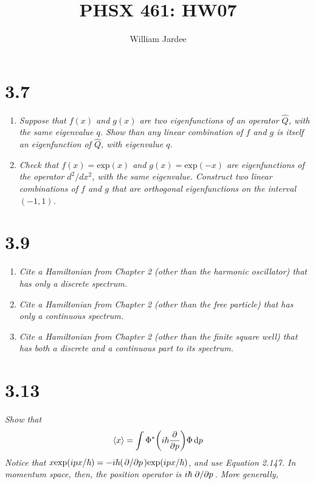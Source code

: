 \documentclass[12pt]{article}
\begin{document}
\title{PHSX 461: HW07}
\author{William Jardee}
\maketitle

\section*{3.7}
\begin{enumerate}[label=\alph*)]
\item \emph{Suppose that $f(x)$ and $g(x)$ are two eigenfunctions of an operator $\hat{Q}$, with the same eigenvalue $q$. Show than any linear combination of $f$ and $g$ is itself an eigenfunction of $\hat{Q}$, with eigenvalue $q$.}\bigskip

\item \emph{Check that $f(x) = \text{exp} (x)$ and $g(x) = \text{exp} (-x)$ are eigenfunctions of the operator $d^2/dx^2$, with the same eigenvalue. Construct two linear combinations of $f$ and $g$ that are orthogonal eigenfunctions on the interval $(-1,1)$.}
\end{enumerate}

\newpage

\section*{3.9}
\begin{enumerate}[label=\alph*)]
\item \emph{Cite a Hamiltonian from Chapter 2 (other than the harmonic oscillator) that has only a discrete spectrum.}\bigskip

\item \emph{Cite a Hamiltonian from Chapter 2 (other than the free particle) that has only a continuous spectrum.}\bigskip

\item \emph{Cite a Hamiltonian from Chapter 2 (other than the finite square well) that has both a discrete and a continuous part to its spectrum.}
\end{enumerate}

\newpage

\section*{3.13}
\emph{Show that}
\[\langle x \rangle = \int \Phi^* \qty(i\hbar\pdv{p})\Phi \dd{p}\]
\emph{Notice that $x\text{exp}(ipx/\hbar) = -i\hbar (\pdv*{p})\text{exp} (ipx/\hbar)$, and use Equation 2.147. In momentum space, then, the position operator is $i\hbar \pdv*{p}$. More generally,}\bigskip
\end{document}
